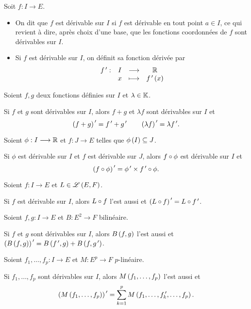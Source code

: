 \begin{defi}
Soit \(f:I\to E\).

\begin{itemize}
    \item On dit que \(f\) est dérivable sur \(I\) si \(f\) est dérivable en tout point \(a\in I\), ce qui revient à dire, après choix d'une base, que les fonctions coordonnées de \(f\) sont dérivables sur \(I\). \\
    \item Si \(f\) est dérivable sur \(I\), on définit sa fonction dérivée par \[\begin{array}[t]{cccc}f^{\,\prime} : & I & \longrightarrow & \mathbb{R} \\ & x & \longmapsto & f^{\,\prime}\left(x\right)\end{array}\]
\end{itemize}
\end{defi}

\begin{prop}
Soient \(f,g\) deux fonctions définies sur \(I\) et \(\lambda\in\mathbb{K}\).

Si \(f\) et \(g\) sont dérivables sur \(I\), alors \(f+g\) et \(\lambda f\) sont dérivables sur \(I\) et \[\left(f+g\right)^{\,\prime}=f^{\,\prime}+g^{\,\prime}\qquad\left(\lambda f\right)^{\,\prime}=\lambda f^{\,\prime}.\]
\end{prop}

\begin{prop}
Soient \(\phi:I\longrightarrow\mathbb{R}\) et \(f:J\to E\) telles que \(\phi\left(I\right)\subseteq J\).

Si \(\phi\) est dérivable sur \(I\) et \(f\) est dérivable sur \(J\), alors \(f\circ\phi\) est dérivable sur \(I\) et \[\left(f\circ\phi\right)^{\,\prime}=\phi^{\,\prime}\times f^{\,\prime}\circ\phi.\]
\end{prop}

\begin{prop}
Soient \(f:I\to E\) et \(L\in\mathscr{L}\left(E,F\right)\).

Si \(f\) est dérivable sur \(I\), alors \(L\circ f\) l'est aussi et \(\left(L\circ f\right)^{\,\prime}=L\circ f^{\,\prime}\).
\end{prop}

\begin{prop}
Soient \(f,g:I\to E\) et \(B:E^2\to F\) bilinéaire.

Si \(f\) et \(g\) sont dérivables sur \(I\), alors \(B\left(f,g\right)\) l'est aussi et \(\left(B\left(f,g\right)\right)^{\,\prime}=B\left(f^{\,\prime},g\right)+B\left(f,g^{\,\prime}\right)\).
\end{prop}

\begin{prop}
Soient \(f_1,\dots,f_p:I\to E\) et \(M:E^p\to F\) \(p\)-linéaire.

Si \(f_1,\dots,f_p\) sont dérivables sur \(I\), alors \(M\left(f_1,\dots,f_p\right)\) l'est aussi et \[\left(M\left(f_1,\dots,f_p\right)\right)^{\,\prime}=\sum_{k=1}^pM\left(f_1,\dots,f_k^{\,\prime},\dots,f_p\right).\]
\end{prop}

